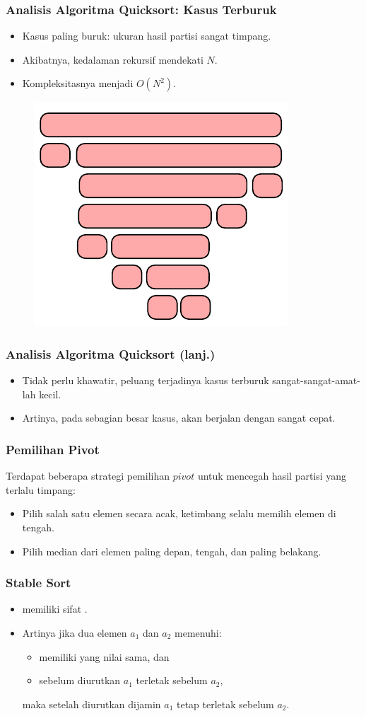 \begin{frame}
\frametitle{Analisis Algoritma Quicksort: Kasus Terburuk}
\begin{itemize}
  \item Kasus paling buruk: ukuran hasil partisi sangat timpang.
  \item Akibatnya, kedalaman rekursif mendekati $N$.
  \item Kompleksitasnya menjadi $O(N^2)$.
\end{itemize}
\begin{figure}
  \centering
  \includegraphics[width=5 cm]{asset/quicksort-complexity-worst.pdf}
\end{figure}
\end{frame}

\begin{frame}
\frametitle{Analisis Algoritma Quicksort (lanj.)}
\begin{itemize}
  \item Tidak perlu khawatir, peluang terjadinya kasus terburuk sangat-sangat-amat-lah  kecil.
  \item Artinya, pada sebagian besar kasus, \fquickSort akan berjalan dengan sangat cepat.
\end{itemize}
\end{frame}

\begin{frame}
\frametitle{Pemilihan Pivot}
Terdapat beberapa strategi pemilihan $pivot$ untuk mencegah hasil partisi yang terlalu timpang:
\begin{itemize}
  \item Pilih salah satu elemen secara acak, ketimbang selalu memilih elemen di tengah.
  \item Pilih median dari elemen paling depan, tengah, dan paling belakang.
  \newline
\end{itemize}
\end{frame}

\begin{frame}
\frametitle{Stable Sort}
\begin{itemize}
  \item \fQuickSort memiliki sifat  .
  \item Artinya jika dua elemen $a_1$ dan $a_2$ memenuhi:
  \begin{itemize}
    \item memiliki yang nilai sama, dan
    \item sebelum diurutkan $a_1$ terletak sebelum $a_2$,
  \end{itemize}
  maka setelah diurutkan  dijamin $a_1$ tetap terletak sebelum $a_2$.
\end{itemize}
\end{frame}


